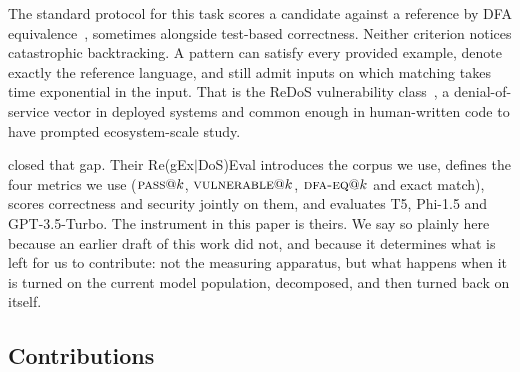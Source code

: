 \documentclass[11pt]{article}
\newcommand{\pass}{\textsc{pass}}
\newcommand{\vuln}{\textsc{vulnerable}}
\newcommand{\dfaeq}{\textsc{dfa-eq}}
\begin{document}
The standard protocol for this task scores a candidate against a reference
by DFA equivalence~\citep{locascio2016neural,kushman2013semantic}, sometimes
alongside test-based correctness. Neither criterion notices catastrophic
backtracking. A pattern can satisfy every provided example, denote exactly the
reference language, and still admit inputs on which matching takes time
exponential in the input. That is the ReDoS vulnerability
class~\citep{davis2018redos}, a denial-of-service vector in deployed systems
and common enough in human-written code to have prompted ecosystem-scale
study.

\citet{siddiq2024regexeval} closed that gap. Their Re(gEx$|$DoS)Eval
introduces the corpus we use, defines the four metrics we use
($\pass{}@k$, $\vuln{}@k$, $\dfaeq{}@k$ and exact match), scores correctness
and security jointly on them, and evaluates T5, Phi-1.5 and GPT-3.5-Turbo.
The instrument in this paper is theirs. We say so plainly here because an
earlier draft of this work did not, and because it determines what is left
for us to contribute: not the measuring apparatus, but what happens when it
is turned on the current model population, decomposed, and then turned back
on itself.

\subsection{Contributions}
\end{document}
